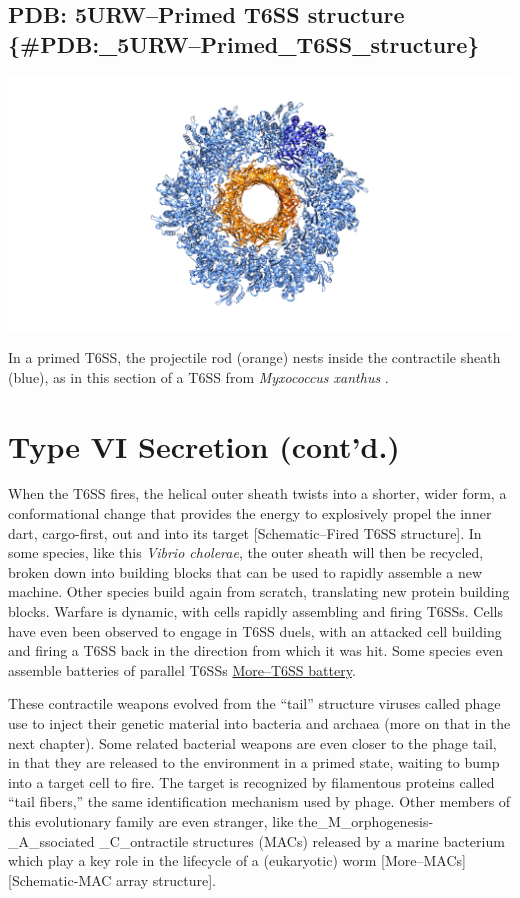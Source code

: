 \documentclass[]{tufte-book}
\begin{document}
\subsection{PDB: 5URW--Primed T6SS structure
\{\#PDB:\_5URW--Primed\_T6SS\_structure\}}\label{pdb-5urwprimed-t6ss-structure-pdb_5urwprimed_t6ss_structure}

\includegraphics{img/schematics/9_6_1}

In a primed T6SS, the projectile rod (orange) nests inside the
contractile sheath (blue), as in this section of a T6SS from
\emph{Myxococcus xanthus} \citet{chang2017}.

\section{Type VI Secretion (cont'd.)}\label{type-vi-secretion-contd.}

When the T6SS fires, the helical outer sheath twists into a shorter,
wider form, a conformational change that provides the energy to
explosively propel the inner dart, cargo-first, out and into its target
{[}Schematic--Fired T6SS structure{]}. In some species, like this
\emph{Vibrio cholerae}, the outer sheath will then be recycled, broken
down into building blocks that can be used to rapidly assemble a new
machine. Other species build again from scratch, translating new protein
building blocks. Warfare is dynamic, with cells rapidly assembling and
firing T6SSs. Cells have even been observed to engage in T6SS duels,
with an attacked cell building and firing a T6SS back in the direction
from which it was hit. Some species even assemble batteries of parallel
T6SSs \protect\hyperlink{moret6ss-battery}{More--T6SS battery}.

These contractile weapons evolved from the ``tail'' structure viruses
called phage use to inject their genetic material into bacteria and
archaea (more on that in the next chapter). Some related bacterial
weapons are even closer to the phage tail, in that they are released to
the environment in a primed state, waiting to bump into a target cell to
fire. The target is recognized by filamentous proteins called ``tail
fibers,'' the same identification mechanism used by phage. Other members
of this evolutionary family are even stranger, like
the\_M\_orphogenesis-\_A\_ssociated \_C\_ontractile structures (MACs)
released by a marine bacterium which play a key role in the lifecycle of
a (eukaryotic) worm {[}More--MACs{]} {[}Schematic-MAC array
structure{]}.
\end{document}
